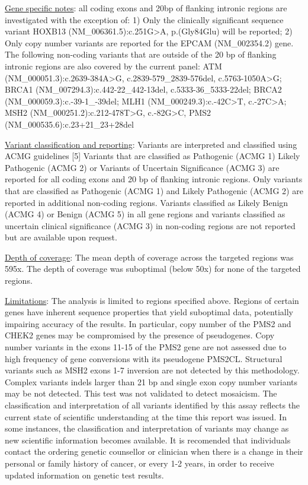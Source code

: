 \documentclass[10pt]{article}
\begin{document}
\hfill \parbox{19cm}{
\underline{Gene specific notes}: all coding exons and 20bp of flanking intronic regions are investigated with the exception of: 1) Only the clinically significant sequence variant HOXB13 (NM\_006361.5):c.251G>A, p.(Gly84Glu) will be reported; 2) Only copy number variants are reported for the EPCAM (NM\_002354.2) gene. The following non-coding variants that are outside of the 20 bp of flanking intronic regions are also covered by the current panel: ATM (NM\_000051.3):c.2639-384A>G, c.2839-579\_2839-576del, c.5763-1050A>G; BRCA1 (NM\_007294.3):c.442-22\_442-13del, c.5333-36\_5333-22del; BRCA2 (NM\_000059.3):c.-39-1\_-39del; MLH1 (NM\_000249.3):c.-42C>T, c.-27C>A; MSH2 (NM\_000251.2):c.212-478T>G, c.-82G>C, PMS2 (NM\_000535.6):c.23+21\_23+28del

\vspace{1em}
\underline{Variant classification and reporting}: Variants are interpreted and classified using ACMG guidelines [5] Variants that are classified as Pathogenic (ACMG 1) Likely Pathogenic (ACMG 2) or Variants of Uncertain Significance (ACMG 3) are reported for all coding exons and 20 bp of flanking intronic regions. Only variants that are classified as Pathogenic (ACMG 1) and Likely Pathogenic (ACMG 2) are reported in additional non-coding regions. Variants classified as Likely Benign (ACMG 4) or Benign (ACMG 5) in all gene regions and variants classified as uncertain clinical significance (ACMG 3) in non-coding regions are not reported but are available upon request.

\vspace{1em}
\underline{Depth of coverage}: The mean depth of coverage across the targeted regions was 595x. The depth of coverage was suboptimal (below 50x) for none of the targeted regions.
}

\hfill \parbox{19cm}{
\underline{Limitations}: The analysis is limited to regions specified above. Regions of certain genes have inherent sequence properties that yield suboptimal data, potentially impairing accuracy of the results. In particular, copy number of the PMS2 and CHEK2 genes may be compromised by the presence of pseudogenes. Copy number variants in the exons 11-15 of the PMS2 gene are not assessed due to high frequency of gene conversions with its pseudogene PMS2CL. Structural variants such as MSH2 exons 1-7 inversion are not detected by this methodology. Complex variants indels larger than 21 bp and single exon copy number variants may be not detected. This test was not validated to detect mosaicism. The classification and interpretation of all variants identified by this assay reflects the current state of scientific understanding at the time this report was issued. In some instances, the classification and interpretation of variants may change as new scientific information becomes available. It is recomended that individuals contact the ordering genetic counsellor or clinician when there is a change in their personal or family history of cancer, or every 1-2 years, in order to receive updated information on genetic test results.
}
\end{document}
